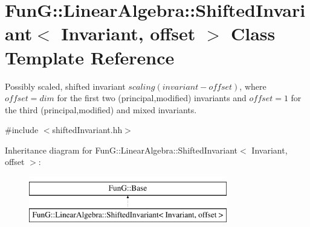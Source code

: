 \hypertarget{classFunG_1_1LinearAlgebra_1_1ShiftedInvariant}{\section{Fun\-G\-:\-:Linear\-Algebra\-:\-:Shifted\-Invariant$<$ Invariant, offset $>$ Class Template Reference}
\label{classFunG_1_1LinearAlgebra_1_1ShiftedInvariant}
}


Possibly scaled, shifted invariant $scaling (invariant - offset)$, where $offset = dim$ for the first two (principal,modified) invariants and $offset = 1$ for the third (principal,modified) and mixed invariants.  




{\ttfamily \#include $<$shifted\-Invariant.\-hh$>$}

Inheritance diagram for Fun\-G\-:\-:Linear\-Algebra\-:\-:Shifted\-Invariant$<$ Invariant, offset $>$\-:\begin{figure}[H]
\begin{center}
\leavevmode
\includegraphics[height=2.000000cm]{classFunG_1_1LinearAlgebra_1_1ShiftedInvariant}
\end{center}
\end{figure}
